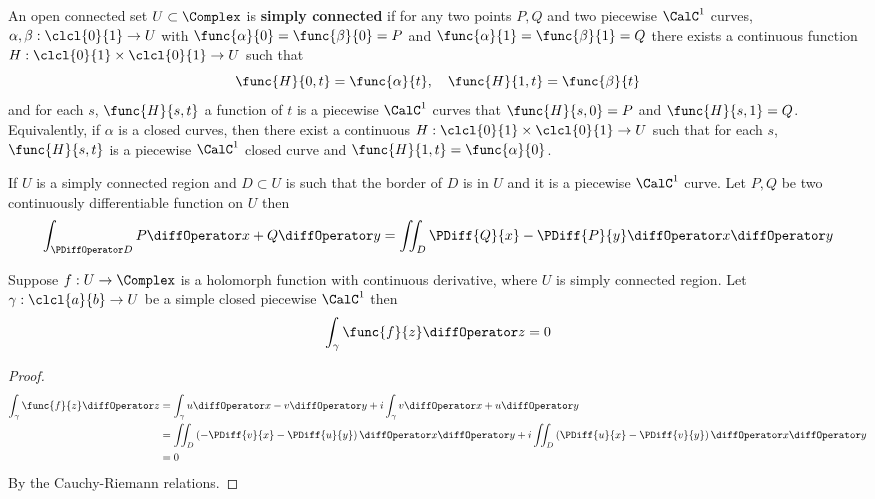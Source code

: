 \begin{definition}
An open connected set \(U \subset \Complex\) is \textbf{simply connected} if for any two points \(P,Q\) and two piecewise \(\CalC^1\) curves, \(\alpha,\beta : \clcl{0}{1} \to U\) with \(\func{\alpha}{0} = \func{\beta}{0} = P \) and \(\func{\alpha}{1} = \func{\beta}{1} = Q\) there exists a continuous function \(H: \clcl{0}{1} \times \clcl{0}{1} \to U\) such that 
\begin{equation*}
    \func{H}{0,t} = \func{\alpha}{t}, \quad \func{H}{1,t} = \func{\beta}{t}
\end{equation*}
and for each \(s\), \(\func{H}{s,t}\) a function of \(t\) is a piecewise \(\CalC^1\) curves that \(\func{H}{s,0} = P\) and \(\func{H}{s,1} = Q\). Equivalently, if \(\alpha\) is a closed curves, then there exist a continuous \(H : \clcl{0}{1} \times \clcl{0}{1} \to U\) such that for each \(s\), \(\func{H}{s,t}\) is a piecewise \(\CalC^1\) closed curve and \(\func{H}{1,t} = \func{\alpha}{0}\).
\end{definition}

\begin{theorem}
    If \(U\) is a simply connected region and \(D \subset U\) is such that the border of \(D\) is in \(U\) and it is a piecewise \(\CalC^1\) curve. Let \(P,Q\) be two continuously differentiable function on \(U\) then 
    \begin{equation*}
        \int_{\PDiffOperator D} P \diffOperator x + Q \diffOperator y = \iint_{D} \PDiff{Q}{x} - \PDiff{P}{y} \diffOperator x \diffOperator y
    \end{equation*}
\end{theorem}

\begin{theorem}
    Suppose \(f: U \to \Complex\) is a holomorph function with continuous derivative, where \(U\) is simply connected region. Let \(\gamma : \clcl{a}{b} \to U\) be a simple closed piecewise \(\CalC^1\) then 
    \begin{equation*}
        \int_{\gamma} \func{f}{z} \diffOperator z = 0
    \end{equation*}
\end{theorem}

\begin{proof}
    \begin{align*}
        \int_{\gamma} \func{f}{z} \diffOperator z &=  \int_{\gamma} u \diffOperator x - v \diffOperator y + i \int_{\gamma} v \diffOperator x + u \diffOperator y \\
        &= \iint_{D} \left(-\PDiff{v}{x} - \PDiff{u}{y}\right) \diffOperator x \diffOperator y +  i\iint_{D} \left(\PDiff{u}{x} - \PDiff{v}{y}\right) \diffOperator x \diffOperator y \\
        &= 0
    \end{align*}
    By the Cauchy-Riemann relations.
\end{proof}

